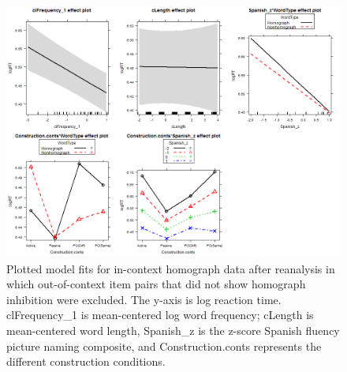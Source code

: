 \begin{figure}[htbp]
\centering
\includegraphics[width=\textwidth,height=\textheight,keepaspectratio]{Rplot37.png}
\caption{Plotted model fits for in-context homograph data after reanalysis in which out-of-context item pairs that did not show homograph inhibition were excluded. The y-axis is log reaction time. clFrequency\_1 is mean-centered log word frequency; cLength is mean-centered word length, Spanish\_z is the z-score Spanish fluency picture naming composite, and Construction.conts represents the different construction conditions.}
\label{fig:Rplot37}
\end{figure}


